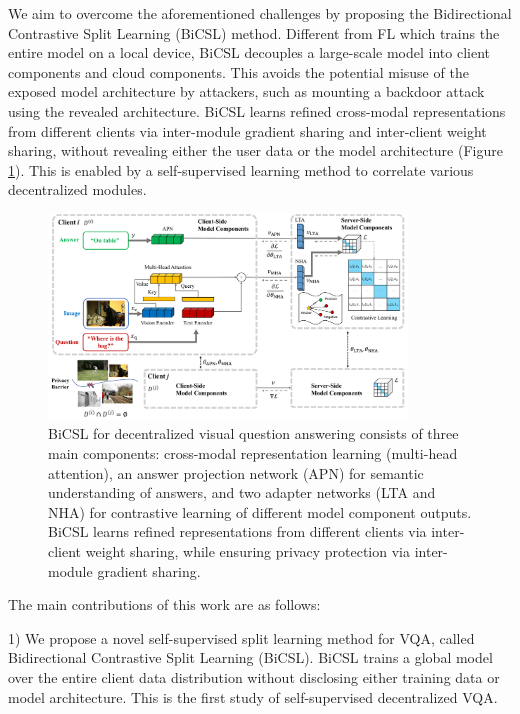 \documentclass[letterpaper]{article} %
\begin{document}
We aim to overcome the aforementioned challenges by proposing the Bidirectional Contrastive Split Learning (BiCSL) method. Different from FL which trains the entire model on a local device, BiCSL decouples a large-scale model into client components and cloud components. This avoids the potential misuse of the exposed model architecture by attackers, such as mounting a backdoor attack using the revealed architecture. BiCSL learns refined cross-modal representations from different clients via inter-module gradient sharing and inter-client weight sharing, without revealing either the user data or the model architecture (Figure \ref{fig:scheme}). This is enabled by a self-supervised learning method to correlate various decentralized modules.


\begin{figure}
    \centering
    \includegraphics[width=0.85\textwidth]{figures/scheme.pdf}
    \caption{BiCSL for decentralized visual question answering consists of three main components: cross-modal representation learning (multi-head attention), an answer projection network (APN) for semantic understanding of answers, and two adapter networks (LTA and NHA) for contrastive learning of different model component outputs. BiCSL learns refined representations from different clients via inter-client weight sharing, while ensuring privacy protection via inter-module gradient sharing.}
    \label{fig:scheme}
\end{figure}

The main contributions of this work are as follows:

1) We propose a novel self-supervised split learning method for VQA, called Bidirectional Contrastive Split Learning (BiCSL). BiCSL trains a global model over the entire client data distribution without disclosing either training data or model architecture. This is the first study of self-supervised decentralized VQA.
\end{document}
